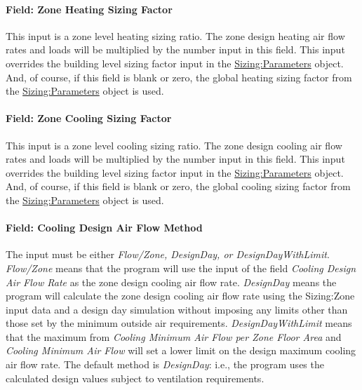 \paragraph{Field: Zone Heating Sizing Factor}\label{field-zone-heating-sizing-factor}

This input is a zone level heating sizing ratio. The zone design heating air flow rates and loads will be multiplied by the number input in this field. This input overrides the building level sizing factor input in the \hyperref[sizingparameters]{Sizing:Parameters} object. And, of course, if this field is blank or zero, the global heating sizing factor from the \hyperref[sizingparameters]{Sizing:Parameters} object is used.

\paragraph{Field: Zone Cooling Sizing Factor}\label{field-zone-cooling-sizing-factor}

This input is a zone level cooling sizing ratio. The zone design cooling air flow rates and loads will be multiplied by the number input in this field. This input overrides the building level sizing factor input in the \hyperref[sizingparameters]{Sizing:Parameters} object. And, of course, if this field is blank or zero, the global cooling sizing factor from the \hyperref[sizingparameters]{Sizing:Parameters} object is used.

\paragraph{Field: Cooling Design Air Flow Method}\label{field-cooling-design-air-flow-method}

The input must be either \emph{Flow/Zone, DesignDay, or DesignDayWithLimit}. \emph{Flow/Zone} means that the program will use the input of the field \emph{Cooling Design Air Flow Rate} as the zone design cooling air flow rate. \emph{DesignDay} means the program will calculate the zone design cooling air flow rate using the Sizing:Zone input data and a design day simulation without imposing any limits other than those set by the minimum outside air requirements. \emph{DesignDayWithLimit} means that the maximum from \emph{Cooling Minimum Air Flow per Zone Floor Area} and \emph{Cooling Minimum Air Flow} will set a lower limit on the design maximum cooling air flow rate. The default method is \emph{DesignDay}: i.e., the program uses the calculated design values subject to ventilation requirements.


